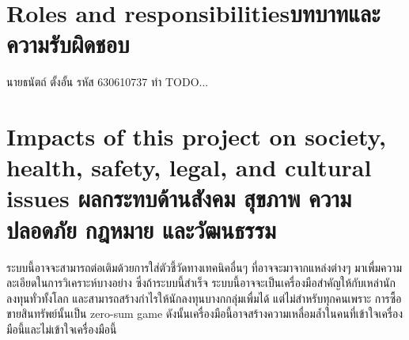 \section{\ifenglish Roles and responsibilities\else บทบาทและความรับผิดชอบ\fi}
นายธนัตถ์ ตั้งอั้น รหัส 630610737 ทำ TODO...

\section{\ifenglish%
Impacts of this project on society, health, safety, legal, and cultural issues
\else%
ผลกระทบด้านสังคม สุขภาพ ความปลอดภัย กฎหมาย และวัฒนธรรม
\fi}
ระบบนี้อาจจะสามารถต่อเติมด้วยการใส่ตัวชี้วัดทางเทคนิคอื่นๆ ที่อาจจะมาจากแหล่งต่างๆ มาเพื่มความละเอียดในการวิเคราะห์บางอย่าง
ซึ่งถ้าระบบนี้สำเร็จ ระบบนี้อาจจะเป็นเครื่องมือสำคัญให้กับเหล่านักลงทุนทั่วทั้งโลก และสามารถสร้างกำไรให้นักลงทุนบางกกลุ่มเพื่มได้ แต่ไม่สำหรับทุกคนเพราะ
การซื้อขายสินทรัพย์นั้นเป็น zero-sum game ดังนั้นเครื่องมือนี้อาจสร้างความเหลื่อมล้ำในคนที่เข้าใจเครื่องมือนี้และไม่เข้าใจเครื่องมือนี้ 
